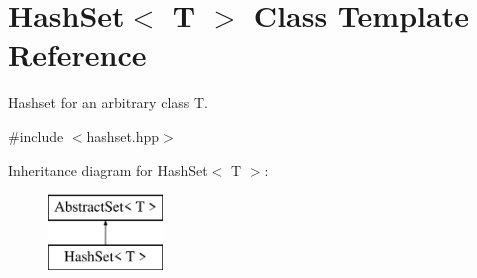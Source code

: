 \hypertarget{class_hash_set}{\section{Hash\-Set$<$ T $>$ Class Template Reference}
\label{class_hash_set}
}


Hashset for an arbitrary class T.  




{\ttfamily \#include $<$hashset.\-hpp$>$}

Inheritance diagram for Hash\-Set$<$ T $>$\-:\begin{figure}[H]
\begin{center}
\leavevmode
\includegraphics[height=2.000000cm]{class_hash_set}
\end{center}
\end{figure}
